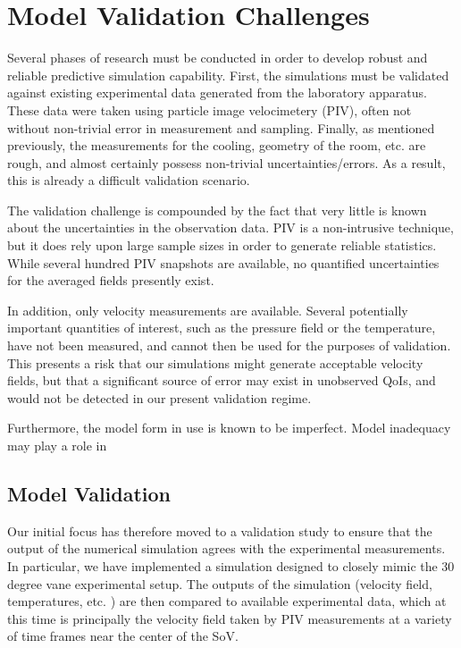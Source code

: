 \documentclass{article}
\begin{document}
%
%
\section{Model Validation Challenges}


Several phases of research must be conducted in order to develop robust
and reliable predictive simulation capability. First, the simulations
must be validated against existing experimental data generated from the
laboratory apparatus. These data were taken using particle image
velocimetery (PIV), often not without non-trivial error in measurement and
sampling. Finally, as mentioned previously, the measurements for the
cooling, geometry of the room, etc. are rough, and almost certainly
possess non-trivial uncertainties/errors. As a result, this is already a
difficult validation scenario. 

The validation challenge is compounded by the fact that very little is
known about the uncertainties in the observation data. PIV is a
non-intrusive technique, but it does rely upon large sample sizes in
order to generate reliable statistics. While several hundred PIV
snapshots are available, no quantified uncertainties for the averaged fields
presently exist.  

In addition, only velocity measurements are available. Several
potentially important quantities of interest, such as the pressure field
or the temperature, have not been measured, and cannot then be used for
the purposes of validation. This presents a risk that our 
simulations might generate acceptable velocity fields, but that a
significant source of error may exist in unobserved QoIs, and would not
be detected in our present validation regime. 

Furthermore, the model form in use is known to be imperfect. 
Model inadequacy may play a role in 

%
%
\subsection{Model Validation}
Our initial focus has therefore moved to a validation study to ensure that the
output of the  numerical simulation agrees with the experimental
measurements. In particular, we have implemented a simulation designed
to closely mimic the 30 degree vane experimental setup. The outputs of
the simulation (velocity field, temperatures, etc. ) are then compared
to available experimental data, which at this time is principally the
velocity field taken by PIV measurements at a variety of time frames
near the center of the SoV. 
\end{document}
